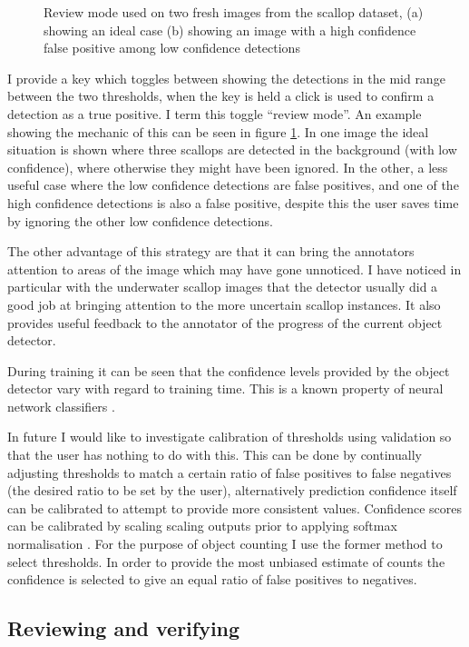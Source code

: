 \begin{figure}[h]
\begin{subfigure}[t]{0.5\linewidth}
  \caption{}
\end{subfigure}%
\caption{Review mode used on two fresh images from the scallop dataset, (a) showing an ideal case (b) showing an image with a high confidence false positive among low confidence detections}
\label {fig:scallop_review}
\end{figure}


I provide a key which toggles between showing the detections in the mid range between the two thresholds, when the key is held a click is used to confirm a detection as a true positive. I term this toggle ``review mode''.  An example showing the mechanic of this can be seen in figure \ref{fig:scallop_review}. In one image the ideal situation is shown where three scallops are detected in the background (with low confidence), where otherwise they might have been ignored. In the other, a less useful case where the low confidence detections are false positives, and one of the high confidence detections is also a false positive, despite this the user saves time by ignoring the other low confidence detections.

The other advantage of this strategy are that it can bring the annotators attention to areas of the image which may have gone unnoticed. I have noticed in particular with the underwater scallop images that the detector usually did a good job at bringing attention to the more uncertain scallop instances. It also provides useful feedback to the annotator of the progress of the current object detector. 

During training it can be seen that the confidence levels provided by the object detector vary with regard to training time. This is a known property of neural network classifiers \cite{Guo2017}.

In future I would like to investigate calibration of thresholds using validation so that the user has nothing to do with this. This can be done by continually adjusting thresholds to match a certain ratio of false positives to false negatives (the desired ratio to be set by the user), alternatively prediction confidence itself can be calibrated to attempt to provide more consistent values. Confidence scores can be calibrated by scaling scaling outputs prior to applying softmax normalisation \cite{Guo2017}. For the purpose of object counting I use the former method to select thresholds. In order to provide the most unbiased estimate of counts the confidence is selected to give an equal ratio of false positives to negatives.
 

\subsection {Reviewing and verifying}


